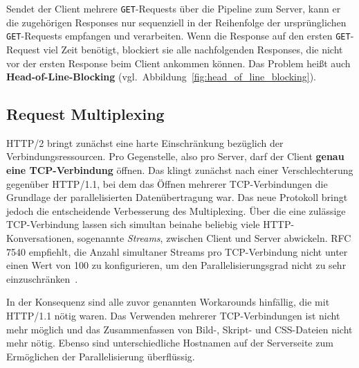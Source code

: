 \documentclass[a4paper, justified, notoc]{tufte-handout} %
\begin{document}
Sendet der Client mehrere \texttt{GET}-Requests über die Pipeline zum Server, kann er die zugehörigen Responses nur sequenziell in der Reihenfolge der ursprünglichen \texttt{GET}-Requests empfangen und verarbeiten. Wenn die Response auf den ersten \texttt{GET}-Request viel Zeit benötigt, blockiert sie alle nachfolgenden Responses, die nicht vor der ersten Response beim Client ankommen können. Das Problem heißt auch \textbf{Head-of-Line-Blocking} (vgl.\ Abbildung~\ref{fig:head_of_line_blocking}).

%

\subsection{Request Multiplexing} %
\label{sub:request_multiplexing}
HTTP/2 bringt zunächst eine harte Einschränkung bezüglich der Verbindungsressourcen. Pro Gegenstelle, also pro Server, darf der Client \textbf{genau eine TCP-Verbindung} öffnen. Das klingt zunächst nach einer Verschlechterung gegenüber HTTP/1.1, bei dem das Öffnen mehrerer TCP-Verbindungen die Grundlage der parallelisierten Datenübertragung war. Das neue Protokoll bringt jedoch die entscheidende Verbesserung des Multiplexing. Über die eine zulässige TCP-Verbindung lassen sich simultan beinahe beliebig viele HTTP-Konversationen, sogenannte \emph{Streams}, zwischen Client und Server abwickeln. RFC 7540 empfiehlt, die Anzahl simultaner Streams pro TCP-Verbindung nicht unter einen Wert von 100 zu konfigurieren, um den Parallelisierungsgrad nicht zu sehr einzuschränken~\citep{weinschenkler:2017}.

In der Konsequenz sind alle zuvor genannten Workarounds hinfällig, die mit HTTP/1.1 nötig waren. Das Verwenden mehrerer TCP-Verbindungen ist nicht mehr möglich und das Zusammenfassen von Bild-, Skript- und CSS-Dateien nicht mehr nötig. Ebenso sind unterschiedliche Hostnamen auf der Serverseite zum Ermöglichen der Parallelisierung überflüssig.
\end{document}
